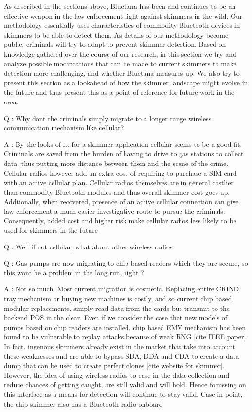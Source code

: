 As described in the sections above, Bluetana has been and continues to be an effective weapon in the law enforcement fight against skimmers in the wild. Our methodology essentially uses characteristics of commodity Bluetooth devices in skimmers to be able to detect them. As details of our methodology become public, criminals will try to adapt to prevent skimmer detection. Based on knowledge gathered over the course of our research, in this section we try and analyze possible modifications that can be made to current skimmers to make detection more challenging, and whether Bluetana measures up. We also try to present this section as a lookahead of how the skimmer landscape might evolve in the future and thus present this as a point of reference for future work in the area.

Q : Why dont the criminals simply migrate to a longer range wireless communication mechanism like cellular?

A : By the looks of it, for a skimmer application cellular seems to be a good fit. Criminals are saved from the burden of having to drive to gas stations to collect data, thus putting more distance between them and the scene of the crime. Cellular radios however add an extra cost of requiring to purchase a SIM card with an active cellular plan. Cellular radios themselves are in general costlier than commodity Bluetooth modules and thus overall skimmer cost goes up. Addtionally, when recovered, presence of an active cellular connection can give law enforcement a much easier investigative route to pursue the criminals. Consequently, added cost and higher risk make cellular radios less likely to be used for skimmers in the future

Q : Well if not cellular, what about other wireless radios

Q : Gas pumps are now migrating to chip based readers which they are secure, so this wont be a problem in the long run, right ?

A : Not so much. Most current migration is cosmetic. Replacing entire CRIND tray mechanism or buying new machines is costly, and so current chip based modular replacements, simply read data from the cards but transmit to the backend POS in the clear. Even if we consider the case that new models of pumps based on chip readers are installed, chip based EMV mechanism has been found to be vulnerable to replay attacks because of weak RNG [cite IEEE paper]. In fact, ingenous skimmers already exist in the market that take into account these weaknesses and are able to bypass SDA, DDA and CDA to create a data dump that can be used to create perfect clones [cite website for skimmer]. However, the idea of using wireless radios to ease in the data collection and reduce chances of getting caught, are still valid and will hold. Hence focussing on this interface as a means for detection will continue to stay valid. Case in point, the chip skimmer also has a Bluetooth radio onboard

